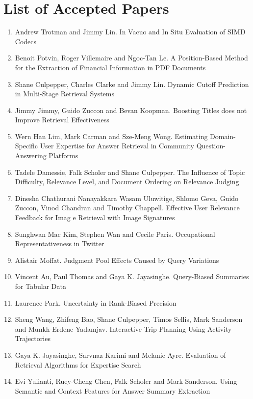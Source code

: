 \documentclass[a4paper]{article}
\begin{document}
\newpage

\section*{List of Accepted Papers}

\begin{enumerate}
\item Andrew Trotman and Jimmy Lin. In Vacuo and In Situ Evaluation of SIMD Codecs
    
\item Benoit Potvin, Roger Villemaire and Ngoc-Tan Le. A Position-Based Method for the Extraction of Financial Information in PDF Documents

\item Shane Culpepper, Charles Clarke and Jimmy Lin. Dynamic Cutoff Prediction in Multi-Stage Retrieval Systems

\item Jimmy Jimmy, Guido Zuccon and Bevan Koopman. Boosting Titles does not Improve Retrieval Effectiveness

\item Wern Han Lim, Mark Carman and Sze-Meng Wong. Estimating Domain-Specific User Expertise for Answer Retrieval in Community Question-Answering Platforms

\item Tadele Damessie, Falk Scholer and Shane Culpepper. The Influence of Topic Difficulty, Relevance Level, and Document Ordering on Relevance Judging

\item Dinesha Chathurani Nanayakkara Wasam Uluwitige, Shlomo Geva, Guido Zuccon, Vinod Chandran and Timothy Chappell. Effective User Relevance Feedback for Imag e Retrieval with Image Signatures 

\item Sunghwan Mac Kim, Stephen Wan and Cecile Paris. Occupational Representativeness in Twitter

\item Alistair Moffat. Judgment Pool Effects Caused by Query Variations

\item Vincent Au, Paul Thomas and Gaya K. Jayasinghe. Query-Biased Summaries for Tabular Data

\item Laurence Park. Uncertainty in Rank-Biased Precision

\item Sheng Wang, Zhifeng Bao, Shane Culpepper, Timos Sellis, Mark Sanderson and Munkh-Erdene Yadamjav. Interactive Trip Planning Using Activity Trajectories

\item Gaya K. Jayasinghe, Sarvnaz Karimi and Melanie Ayre. Evaluation of Retrieval Algorithms for Expertise Search 

\item Evi Yulianti, Ruey-Cheng Chen, Falk Scholer and Mark Sanderson. Using Semantic and Context Features for Answer Summary Extraction

\end{enumerate}
\end{document}
